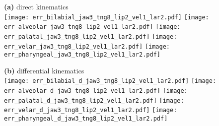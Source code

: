 \documentclass[varwidth=7.5in]{standalone}
\begin{document}
\raggedright

{\bf (a)} direct kinematics\\
\texttt{[image: err\_bilabial\_jaw3\_tng8\_lip2\_vel1\_lar2.pdf]}%
\texttt{[image: err\_alveolar\_jaw3\_tng8\_lip2\_vel1\_lar2.pdf]}%
\texttt{[image: err\_palatal\_jaw3\_tng8\_lip2\_vel1\_lar2.pdf]}%
\texttt{[image: err\_velar\_jaw3\_tng8\_lip2\_vel1\_lar2.pdf]}%
\texttt{[image: err\_pharyngeal\_jaw3\_tng8\_lip2\_vel1\_lar2.pdf]}

{\bf (b)} differential kinematics\\
\texttt{[image: err\_bilabial\_d\_jaw3\_tng8\_lip2\_vel1\_lar2.pdf]}%
\texttt{[image: err\_alveolar\_d\_jaw3\_tng8\_lip2\_vel1\_lar2.pdf]}%
\texttt{[image: err\_palatal\_d\_jaw3\_tng8\_lip2\_vel1\_lar2.pdf]}%
\texttt{[image: err\_velar\_d\_jaw3\_tng8\_lip2\_vel1\_lar2.pdf]}%
\texttt{[image: err\_pharyngeal\_d\_jaw3\_tng8\_lip2\_vel1\_lar2.pdf]}
\end{document}
